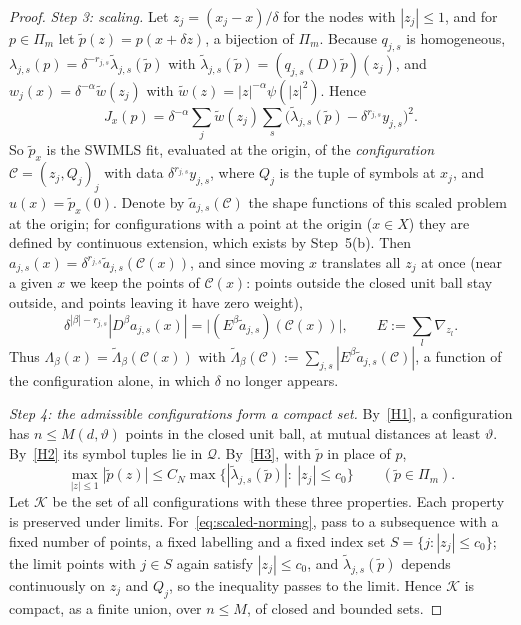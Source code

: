 \documentclass[12pt]{amsart}
\theoremstyle{definition}
\theoremstyle{remark}
\newcommand{\Pm}{\Pi_m}
\begin{document}
\begin{proof}
\emph{Step 3: scaling.} Let $z_j=(x_j-x)/\delta$ for the nodes with $|z_j|\le1$, and for
$p\in\Pm$ let $\tilde p(z)=p(x+\delta z)$, a bijection of $\Pm$. Because $q_{j,s}$ is
homogeneous, $\lambda_{j,s}(p)=\delta^{-r_{j,s}}\tilde\lambda_{j,s}(\tilde p)$ with
$\tilde\lambda_{j,s}(\tilde p)=(q_{j,s}(D)\tilde p)(z_j)$, and $w_j(x)=\delta^{-\alpha}\tilde w(z_j)$
with $\tilde w(z)=|z|^{-\alpha}\psi(|z|^2)$. Hence
\[
  J_x(p)=\delta^{-\alpha}\sum_j\tilde w(z_j)\sum_s\bigl(\tilde\lambda_{j,s}(\tilde p)
  -\delta^{r_{j,s}}y_{j,s}\bigr)^2 .
\]
So $\tilde p_x$ is the SWIMLS fit, evaluated at the origin, of the \emph{configuration}
$\mathcal C=(z_j,Q_j)_j$ with data $\delta^{r_{j,s}}y_{j,s}$, where $Q_j$ is the tuple of symbols at
$x_j$, and $u(x)=\tilde p_x(0)$. Denote by $\tilde a_{j,s}(\mathcal C)$ the shape functions of this scaled
problem at the origin; for configurations with a point at the origin ($x\in X$) they are
defined by continuous extension, which exists by Step~5(b). Then $a_{j,s}(x)=\delta^{r_{j,s}}\tilde a_{j,s}(\mathcal C(x))$, and since moving
$x$ translates all $z_j$ at once (near a given $x$ we keep the points of $\mathcal C(x)$:
points outside the closed unit ball stay outside, and points leaving it have zero weight),
\[
  \delta^{|\beta|-r_{j,s}}|D^\beta a_{j,s}(x)|=\bigl|(E^\beta\tilde a_{j,s})(\mathcal C(x))\bigr|,\qquad
  E:=\sum_l\nabla_{z_l}.
\]
Thus $\Lambda_\beta(x)=\tilde\Lambda_\beta(\mathcal C(x))$ with
$\tilde\Lambda_\beta(\mathcal C):=\sum_{j,s}|E^\beta\tilde a_{j,s}(\mathcal C)|$, a function of the configuration
alone, in which $\delta$ no longer appears.

\emph{Step 4: the admissible configurations form a compact set.} By~\ref{H1}, a configuration has
$n\le M(d,\vartheta)$ points in the closed unit ball, at mutual distances at least $\vartheta$. By~\ref{H2}
its symbol tuples lie in $\mathcal Q$. By~\ref{H3}, with $\tilde p$ in place of $p$,
\begin{equation}\label{eq:scaled-norming}
  \max_{|z|\le1}|\tilde p(z)|\le C_N\max\{|\tilde\lambda_{j,s}(\tilde p)|:\ |z_j|\le c_0\}
  \qquad(\tilde p\in\Pm).
\end{equation}
Let $\mathcal K$ be the set of all configurations with these three properties. Each property is
preserved under limits. For~\eqref{eq:scaled-norming}, pass to a subsequence with a fixed number
of points, a fixed labelling and a fixed index set $S=\{j:|z_j|\le c_0\}$; the limit points
with $j\in S$ again satisfy $|z_j|\le c_0$, and $\tilde\lambda_{j,s}(\tilde p)$ depends
continuously on $z_j$ and $Q_j$, so the inequality passes to the limit. Hence $\mathcal K$ is compact, as a finite union, over $n\le M$, of closed and
bounded sets.


\end{proof}
\end{document}
